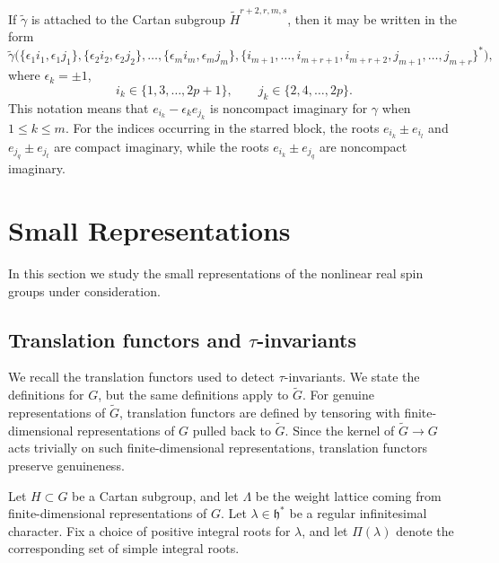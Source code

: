 \documentclass{amsart}
\theoremstyle{definition}
\newcommand{\tu}{\widetilde}
\begin{document}
If $\tu\gamma$ is attached to the Cartan subgroup $\widetilde H^{r+2,r,m,s}$, then it may be written in the form
\begin{equation*}
\tu\gamma\bigl(
\{\epsilon_1 i_1,\epsilon_1 j_1\},
\{\epsilon_2 i_2,\epsilon_2 j_2\},
\ldots,
\{\epsilon_m i_m,\epsilon_m j_m\},
\{i_{m+1},\ldots,i_{m+r+1},i_{m+r+2},
j_{m+1},\ldots,j_{m+r}\}^*
\bigr),
\end{equation*}
where $\epsilon_k=\pm 1$,
\begin{equation*}
i_k\in \{1,3,\ldots,2p+1\},
\qquad
j_k\in \{2,4,\ldots,2p\}.
\end{equation*}
This notation means that $e_{i_k}-\epsilon_k e_{j_k}$ is noncompact imaginary for $\gamma$ when $1\leq k\leq m$. For the indices occurring in the starred block, the roots $e_{i_k}\pm e_{i_l}$ and $e_{j_q}\pm e_{j_t}$ are compact imaginary, while the roots $e_{i_k}\pm e_{j_q}$ are noncompact imaginary.









\section{Small Representations}

In this section we study the small representations of the nonlinear real spin groups under consideration.

\subsection{Translation functors and $\tau$-invariants}

We recall the translation functors used to detect $\tau$-invariants. We state the definitions for $G$, but the same definitions apply to $\widetilde G$. For genuine representations of $\widetilde G$, translation functors are defined by tensoring with finite-dimensional representations of $G$ pulled back to $\widetilde G$. Since the kernel of $\widetilde G\to G$ acts trivially on such finite-dimensional representations, translation functors preserve genuineness.

Let $H\subset G$ be a Cartan subgroup, and let $\Lambda$ be the weight lattice coming from finite-dimensional representations of $G$. Let $\lambda\in\mathfrak h^*$ be a regular infinitesimal character. Fix a choice of positive integral roots for $\lambda$, and let $\Pi(\lambda)$ denote the corresponding set of simple integral roots.
\end{document}
